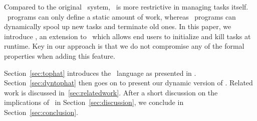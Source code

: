 Compared to the original \ITASKS\ system, \TOPHAT\ is more restrictive in managing tasks itself.
\TOPHAT\ programs can only define a static amount of work, whereas \ITASKS\ programs can dynamically spool up new tasks and terminate old ones.
In this paper, we introduce \DYNTOPHAT, an extension to \TOPHAT\ which allows end users to initialize and kill tasks at runtime.
Key in our approach is that we do not compromise any of the formal properties when adding this feature.


Section~\ref{sec:tophat} introduces the \TOPHAT\ language as presented in \citet{Steenvoorden22}.
Section~\ref{sec:dyntophat} then goes on to present our dynamic version of \TOPHAT.
Related work is discussed in~\ref{sec:relatedwork}. After a short discussion on the implications of \DYNTOPHAT\ in Section~\ref{sec:discussion}, we conclude in Section~\ref{sec:conclusion}.
